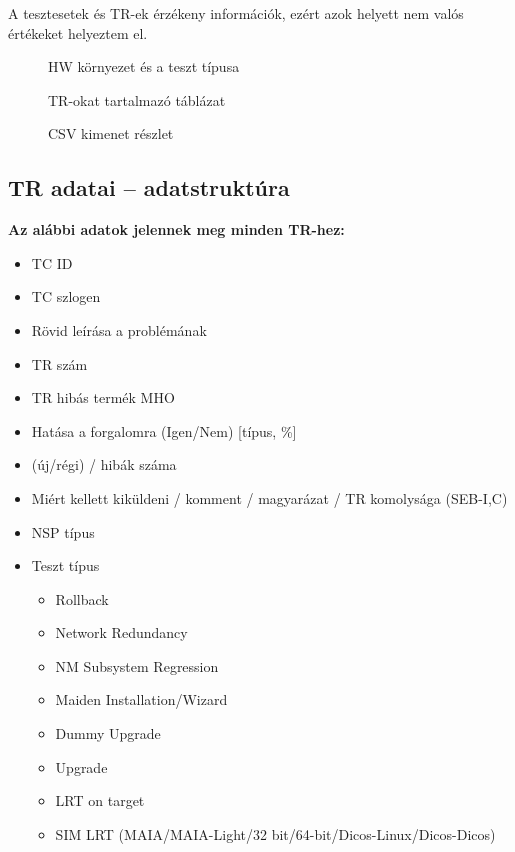 \documentclass[a4paper,oneside,12pt]{article}
\begin{document}
	A tesztesetek és TR-ek érzékeny információk, ezért azok helyett nem valós értékeket helyeztem el.
	\begin{figure}[bth]
		\centering
		\caption{HW környezet és a teszt típusa}
	\end{figure}
	\begin{figure}[bth]
		\centering
		\caption{TR-okat tartalmazó táblázat}
	\end{figure}
\begin{landscape}
\hfill
\begin{figure}[tbh]
		\centering
		\caption{CSV kimenet részlet}
\end{figure}
\end{landscape}
\subsection{TR adatai -- adatstruktúra}
\textbf{Az alábbi adatok jelennek meg minden TR-hez:}
\begin{itemize}
	\item TC ID
	\item TC szlogen
	\item Rövid leírása a problémának
	\item TR szám
	\item TR hibás termék MHO
	\item Hatása a forgalomra (Igen/Nem) [típus, \%]
	\item (új/régi) / hibák száma
	\item Miért kellett kiküldeni / komment / magyarázat / TR komolysága (SEB-I,C)
	\item NSP típus
	\item Teszt típus
	\begin{itemize}
		\item Rollback
		\item Network Redundancy
		\item NM Subsystem Regression
		\item Maiden Installation/Wizard
		\item Dummy Upgrade
		\item Upgrade
		\item LRT on target
		\item SIM LRT (MAIA/MAIA-Light/32 bit/64-bit/Dicos-Linux/Dicos-Dicos)
	\end{itemize}
\end{itemize}
\end{document}
